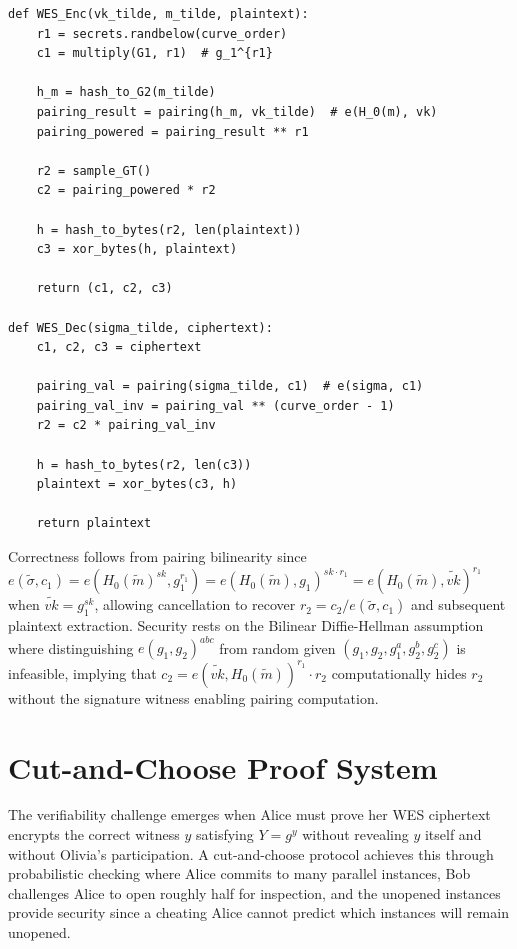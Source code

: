 \documentclass[11pt,a4paper]{article}
\begin{document}
{\begin{lstlisting}[caption={WES Implementation}]
def WES_Enc(vk_tilde, m_tilde, plaintext):
    r1 = secrets.randbelow(curve_order)
    c1 = multiply(G1, r1)  # g_1^{r1}
    
    h_m = hash_to_G2(m_tilde)
    pairing_result = pairing(h_m, vk_tilde)  # e(H_0(m), vk)
    pairing_powered = pairing_result ** r1
    
    r2 = sample_GT()
    c2 = pairing_powered * r2
    
    h = hash_to_bytes(r2, len(plaintext))
    c3 = xor_bytes(h, plaintext)
    
    return (c1, c2, c3)

def WES_Dec(sigma_tilde, ciphertext):
    c1, c2, c3 = ciphertext
    
    pairing_val = pairing(sigma_tilde, c1)  # e(sigma, c1)
    pairing_val_inv = pairing_val ** (curve_order - 1)
    r2 = c2 * pairing_val_inv
    
    h = hash_to_bytes(r2, len(c3))
    plaintext = xor_bytes(c3, h)
    
    return plaintext
\end{lstlisting}

Correctness follows from pairing bilinearity since $e(\tilde{\sigma}, c_1) = e(H_0(\tilde{m})^{sk}, g_1^{r_1}) = e(H_0(\tilde{m}), g_1)^{sk \cdot r_1} = e(H_0(\tilde{m}), \tilde{vk})^{r_1}$ when $\tilde{vk} = g_1^{sk}$, allowing cancellation to recover $r_2 = c_2 / e(\tilde{\sigma}, c_1)$ and subsequent plaintext extraction. Security rests on the Bilinear Diffie-Hellman assumption where distinguishing $e(g_1, g_2)^{abc}$ from random given $(g_1, g_2, g_1^a, g_2^b, g_2^c)$ is infeasible, implying that $c_2 = e(\tilde{vk}, H_0(\tilde{m}))^{r_1} \cdot r_2$ computationally hides $r_2$ without the signature witness enabling pairing computation.

\section{Cut-and-Choose Proof System}

The verifiability challenge emerges when Alice must prove her WES ciphertext encrypts the correct witness $y$ satisfying $Y = g^y$ without revealing $y$ itself and without Olivia's participation. A cut-and-choose protocol achieves this through probabilistic checking where Alice commits to many parallel instances, Bob challenges Alice to open roughly half for inspection, and the unopened instances provide security since a cheating Alice cannot predict which instances will remain unopened.

}
\end{document}
